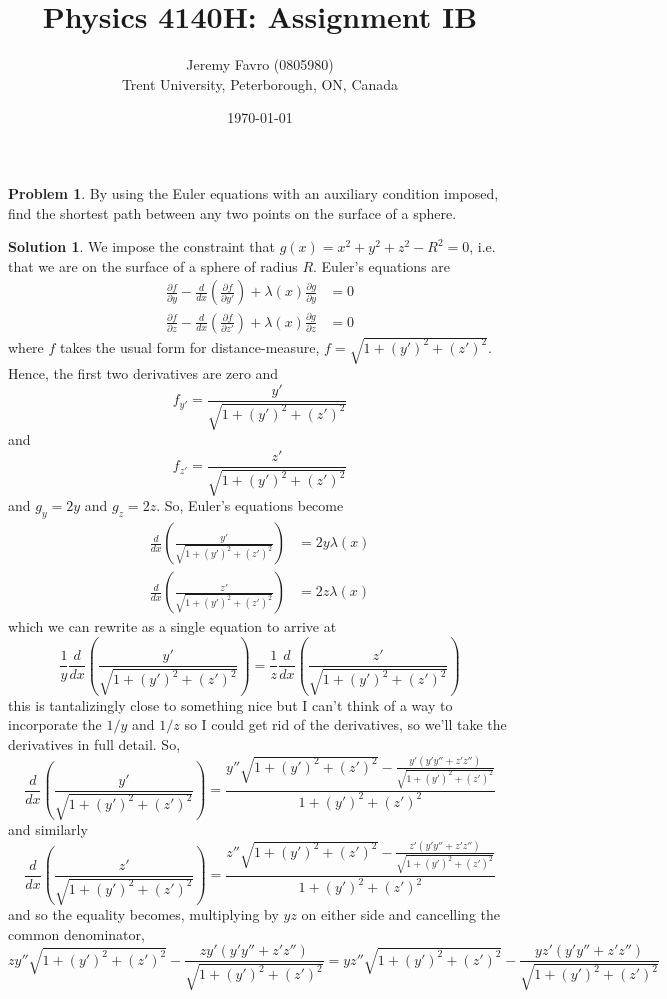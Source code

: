 \documentclass[10pt]{article}
\title{Physics 4140H: Assignment IB}
\author{Jeremy Favro (0805980) \\ Trent University, Peterborough, ON, Canada}
\date{\today}
\theoremstyle{definition}
\newtheorem{problem}{Problem}
\newtheorem{soln}{Solution}
\begin{document}
\maketitle

\begin{problem} By using the Euler equations with an auxiliary condition imposed, find the shortest path between
any two points on the surface of a sphere.
\end{problem}
\begin{soln} We impose the constraint that $g(x)=x^2+y^2+z^2-R^2=0$, i.e. that we are on the surface of a sphere of radius
  $R$. Euler's equations are
  \begin{align*}
    \frac{\partial f}{\partial y}-\frac{d}{dx}\left(\frac{\partial f}{\partial y'}\right)+\lambda(x)\frac{\partial g}{\partial y} & =0 \\
    \frac{\partial f}{\partial z}-\frac{d}{dx}\left(\frac{\partial f}{\partial z'}\right)+\lambda(x)\frac{\partial g}{\partial z} & =0
  \end{align*}
  where $f$ takes the usual form for distance-measure, $f=\sqrt{1+(y')^2+(z')^2}$. Hence, the first two derivatives are zero
  and
  $$
    f_{y'}=\frac{y'}{\sqrt{1+(y')^2+(z')^2}}
  $$
  and $$f_{z'}=\frac{z'}{\sqrt{1+(y')^2+(z')^2}}$$
  and $g_y=2y$ and $g_z=2z$. So, Euler's equations become
  \begin{align*}
    \frac{d}{dx}\left(\frac{y'}{\sqrt{1+(y')^2+(z')^2}}\right) & =2y\lambda(x) \\
    \frac{d}{dx}\left(\frac{z'}{\sqrt{1+(y')^2+(z')^2}}\right) & =2z\lambda(x)
  \end{align*}
  which we can rewrite as a single equation to arrive at
  $$\frac{1}{y}\frac{d}{dx}\left(\frac{y'}{\sqrt{1+(y')^2+(z')^2}}\right)=\frac{1}{z}\frac{d}{dx}\left(\frac{z'}{\sqrt{1+(y')^2+(z')^2}}\right)$$
  this is tantalizingly close to something nice but I can't think of a way to incorporate the $1/y$ and $1/z$ so I could get rid of the derivatives, so
  we'll take the derivatives in full detail. So,
  $$\frac{d}{dx}\left(\frac{y'}{\sqrt{1+(y')^2+(z')^2}}\right)=\frac{y''\sqrt{1+(y')^2+(z')^2}-\frac{y'(y'y''+z'z'')}{\sqrt{1+(y')^2+(z')^2}}}{1+(y')^2+(z')^2}$$
  and similarly
  $$\frac{d}{dx}\left(\frac{z'}{\sqrt{1+(y')^2+(z')^2}}\right)=\frac{z''\sqrt{1+(y')^2+(z')^2}-\frac{z'(y'y''+z'z'')}{\sqrt{1+(y')^2+(z')^2}}}{1+(y')^2+(z')^2}$$
  and so the equality becomes, multiplying by $yz$ on either side and cancelling the common denominator,
  $$zy''\sqrt{1+(y')^2+(z')^2}-\frac{zy'(y'y''+z'z'')}{\sqrt{1+(y')^2+(z')^2}}=yz''\sqrt{1+(y')^2+(z')^2}-\frac{yz'(y'y''+z'z'')}{\sqrt{1+(y')^2+(z')^2}}$$

\end{soln}
\end{document}
